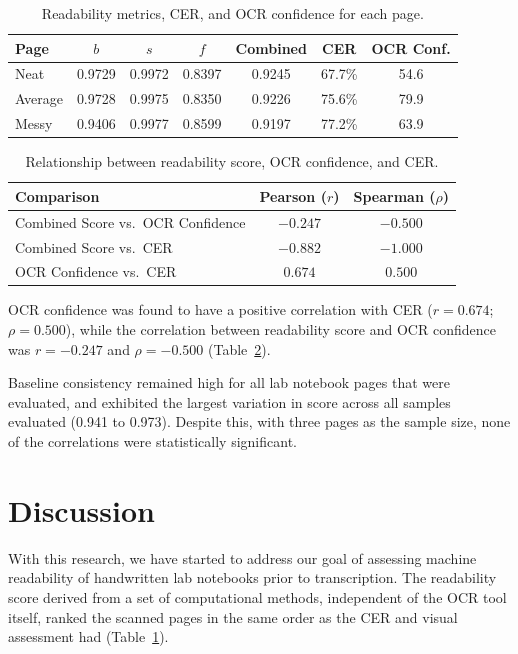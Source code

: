\documentclass[conference]{IEEEtran}
\begin{document}
\begin{table}[t]
  \centering
  \caption{Readability metrics, CER, and OCR confidence for each page.}
  \label{tab:raw}
  \footnotesize
  \setlength{\tabcolsep}{4pt}
  \begin{tabular}{@{}lcccccc@{}}
    \toprule
    Page & $b$ & $s$ & $f$ & Combined & CER & OCR Conf. \\
    \midrule
    Neat    & 0.9729 & 0.9972 & 0.8397 & 0.9245 & 67.7\% & 54.6 \\
    Average & 0.9728 & 0.9975 & 0.8350 & 0.9226 & 75.6\% & 79.9 \\
    Messy   & 0.9406 & 0.9977 & 0.8599 & 0.9197 & 77.2\% & 63.9 \\
    \bottomrule
  \end{tabular}
\end{table}

\begin{table}[t]
  \centering
  \caption{Relationship between readability score, OCR confidence, and CER.}
  \label{tab:corr}
  \footnotesize
  \begin{tabular}{@{}lcc@{}}
    \toprule
    Comparison & Pearson ($r$) & Spearman ($\rho$) \\
    \midrule
    Combined Score vs.\ OCR Confidence & $-0.247$ & $-0.500$ \\
    Combined Score vs.\ CER            & $-0.882$ & $-1.000$ \\
    OCR Confidence vs.\ CER            & $0.674$  & $0.500$  \\
    \bottomrule
  \end{tabular}
\end{table}

OCR confidence was found to have a positive correlation with CER
($r = 0.674$; $\rho = 0.500$), while the correlation between readability score
and OCR confidence was $r = -0.247$ and $\rho = -0.500$
(Table~\ref{tab:corr}).

Baseline consistency remained high for all lab notebook pages that were
evaluated, and exhibited the largest variation in score across all samples
evaluated (0.941 to 0.973). Despite this, with three pages as the sample size,
none of the correlations were statistically significant.


\section{Discussion}
\label{sec:discussion}
With this research, we have started to address our goal of assessing machine
readability of handwritten lab notebooks prior to transcription. The
readability score derived from a set of computational methods, independent of
the OCR tool itself, ranked the scanned pages in the same order as the CER and
visual assessment had (Table~\ref{tab:raw}). 
\end{document}

